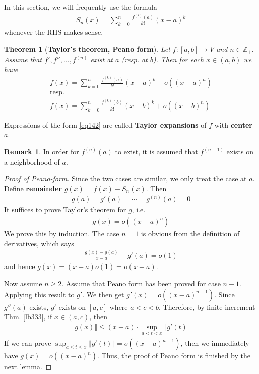 \documentclass[12pt,b5paper,notitlepage]{article}
\theoremstyle{definition}
\newtheorem{rem}[df]{Remark}
\theoremstyle{plain}
\newtheorem{thm}[df]{Theorem}
\newcommand{\Zbb}{\mathbb Z}
\numberwithin{equation}{section}
\begin{document}
In this section, we will frequently use the formula
\begin{align}
S_n(x)=\sum_{k=0}^n\frac{f^{(k)}(a)}{k!}(x-a)^k
\end{align}
whenever the RHS makes sense.


\begin{thm}[\textbf{Taylor's theorem, Peano form}]\label{lb360}
Let $f:[a,b]\rightarrow V$ and $n\in\Zbb_+$. Assume that $f',f'',\dots,f^{(n)}$ exist at $a$ (resp. at $b$). Then for each $x\in (a,b)$ we have
\begin{subequations}
\begin{gather}
f(x)=\sum_{k=0}^n\frac{f^{(k)}(a)}{k!}(x-a)^k+o((x-a)^n)\label{eq142}\\
\text{resp.}\nonumber\\
f(x)=\sum_{k=0}^n\frac{f^{(k)}(b)}{k!}(x-b)^k+o((x-b)^n) \label{eq143}
\end{gather}
\end{subequations}
\end{thm}


Expressions of the form \eqref{eq142} are called \textbf{Taylor expansions}  of $f$ with \textbf{center} $a$.

\begin{rem}
In order for $f^{(n)}(a)$ to exist, it is assumed that $f^{(n-1)}$ exists on a neighborhood of $a$.
\end{rem}


\begin{proof}[Proof of Peano-form]
Since the two cases are similar, we only treat the case at $a$. Define \textbf{remainder}  $g(x)=f(x)-S_n(x)$. Then
\begin{align}
g(a)=g'(a)=\cdots=g^{(n)}(a)=0  \label{eq140}
\end{align}
It suffices to prove Taylor's theorem for $g$, i.e.
\begin{align}
g(x)=o((x-a)^n)
\end{align}
We prove this by induction. The case $n=1$ is obvious from the definition of derivatives, which says
\begin{align}
\frac{g(x)-g(a)}{x-a}-g'(a)=o(1)
\end{align}
and hence $g(x)=(x-a)o(1)=o(x-a)$. 

Now assume $n\geq 2$. Assume that Peano form has been proved for case $n-1$. Applying this result to $g'$. We then get $g'(x)=o((x-a)^{n-1})$. Since $g''(a)$ exists,  $g'$ exists on $[a,c]$ where $a<c<b$. Therefore, by finite-increment Thm. \ref{lb333}, if $x\in(a,c)$, then
\begin{align*}
\Vert g(x)\Vert\leq (x-a)\cdot\sup_{a<t<x}\Vert g'(t)\Vert
\end{align*}
If we can prove $\sup_{a\leq t\leq x}\Vert g'(t)\Vert=o((x-a)^{n-1})$, then we immediately have $g(x)=o((x-a)^n)$. Thus, the proof of Peano form is finished by the next lemma.
\end{proof}
\end{document}
